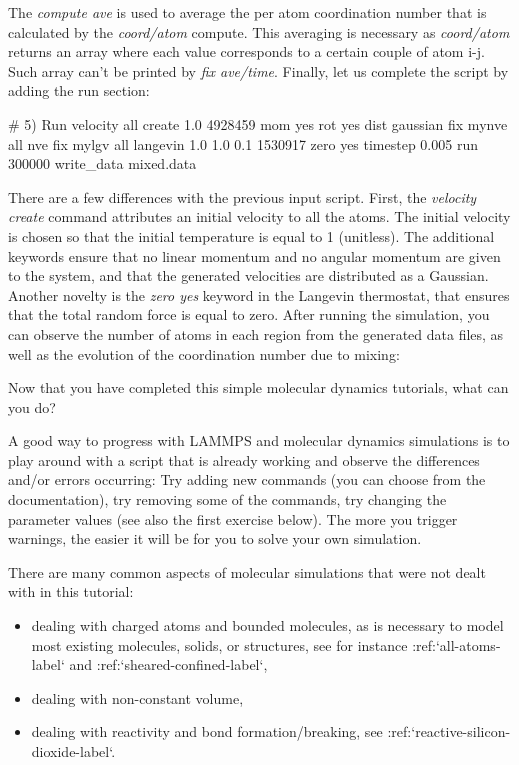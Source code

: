 \noindent The \textit{compute ave} is used to average the per atom
coordination number that is calculated by the \textit{coord/atom} compute.
This averaging is necessary as \textit{coord/atom} returns an array where each value corresponds 
to a certain couple of atom i-j. Such array can't be printed by \textit{fix ave/time}. 
Finally, let us complete the script by adding the run section:

\begin{lcverbatim}
# 5) Run
velocity all create 1.0 4928459 mom yes rot yes dist gaussian
fix mynve all nve
fix mylgv all langevin 1.0 1.0 0.1 1530917 zero yes
timestep 0.005
run 300000
write_data mixed.data
\end{lcverbatim}

\noindent There are a few differences with the
previous input script. First, the \textit{velocity create}
command attributes an initial velocity to all the atoms.
The initial velocity is chosen so that the initial
temperature is equal to 1 (unitless). The additional
keywords ensure that no linear momentum and no angular
momentum are given to the system, and that the generated
velocities are distributed as a Gaussian. Another novelty
is the \textit{zero yes} keyword in the Langevin thermostat, that
ensures that the total random force is equal to zero.
After running the simulation, you can observe the number
of atoms in each region from the generated data files, as
well as the evolution of the coordination number due to
mixing:

Now that you have completed this simple molecular dynamics tutorials, what can you do?

A good way to progress with LAMMPS and molecular dynamics
simulations is to play around with a script that is already
working and observe the differences and/or errors occurring:
Try adding new commands (you can choose from the documentation),
try removing some of the commands, try changing the parameter values
(see also the first exercise below).
The more you trigger warnings, the easier it will be for you to solve your
own simulation.

There are many common aspects of molecular simulations that were not dealt with in this
tutorial:
\begin{itemize}
\item dealing with charged atoms and bounded molecules, as is necessary to model most existing molecules, solids, or structures, see for instance :ref:`all-atoms-label` and :ref:`sheared-confined-label`,
\item dealing with non-constant volume,
\item dealing with reactivity and bond formation/breaking, see :ref:`reactive-silicon-dioxide-label`.
\end{itemize}

